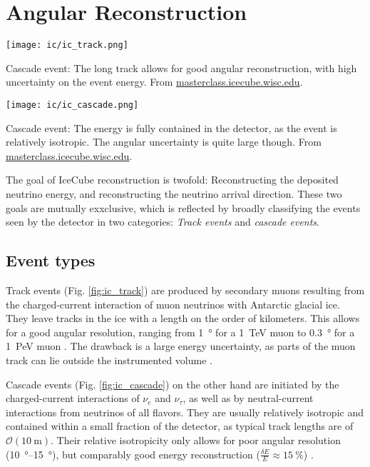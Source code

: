 \section{Angular Reconstruction}\label{reconstruction}
\begin{marginfigure}
    \texttt{[image: ic/ic\_track.png]}
    \caption[Track event in IceCube]{Cascade event: The long track allows for good angular reconstruction, with high uncertainty on the event energy. From \url{masterclass.icecube.wisc.edu}.}
\end{marginfigure}
\begin{marginfigure}
    \texttt{[image: ic/ic\_cascade.png]}
    \caption[Cascade event in IceCube]{Cascade event: The energy is fully contained in the detector, as the event is relatively isotropic. The angular uncertainty is quite large though. From \url{masterclass.icecube.wisc.edu}.}
\end{marginfigure}
The goal of IceCube reconstruction is twofold: Reconstructing the deposited neutrino energy, and reconstructing the neutrino arrival direction. These two goals are mutually exxclusive, which is reflected by broadly classifying the events seen by the detector in two categories: \textit{Track events} and \textit{cascade events}.

\subsection{Event types}

Track events (Fig. \ref{fig:ic_track}) are produced by secondary muons resulting from the charged-current interaction of muon neutrinos with Antarctic glacial ice. They leave tracks in the ice with a length on the order of kilometers. This allows for a good angular resolution, ranging from \SI{1}{\degree} for a \SI{1}{\TeV} muon to \SI{0.3}{\degree} for a \SI{1}{\peta\eV} muon . The drawback is a large energy uncertainty, as parts of the muon track can lie outside the instrumented volume .

Cascade events (Fig. \ref{fig:ic_cascade}) on the other hand are initiated by the charged-current interactions of $\nu_e$ and $\nu_\tau$, as well as by neutral-current interactions from neutrinos of all flavors. They are usually relatively isotropic and contained within a small fraction of the detector, as typical track lengths are of $\mathcal{O}(\SI{10}{\meter})$. Their relative isotropicity only allows for poor angular resolution (\SIrange{10}{15}{\degree}), but comparably good energy reconstruction ($\frac{\delta E}{E} \approx \SI{15}{\percent}$) \cite{Aartsen2017a}.

